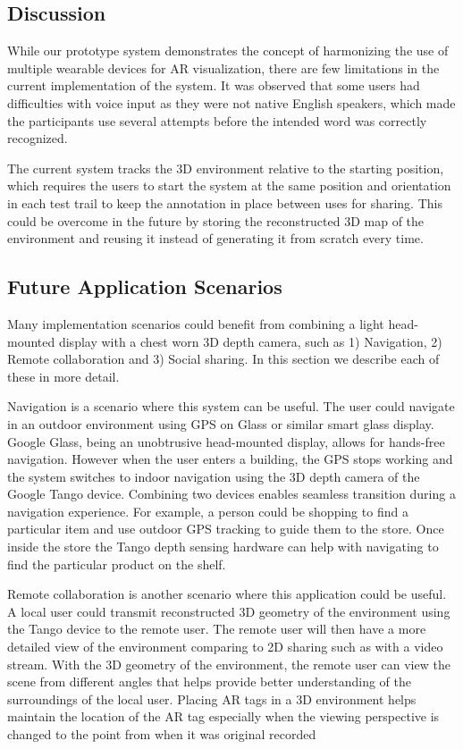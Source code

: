 \subsection{Discussion}

%
%
While our prototype  system demonstrates the concept of harmonizing the use of multiple wearable devices for AR visualization, there are few limitations in the current implementation of the system. It was observed that some users had difficulties with voice input as they were not native English speakers, which made the participants use several attempts before the intended word was correctly recognized.  

The current system tracks the 3D environment relative to the starting position, which requires the users to start the system at the same position and orientation in each test trail to keep the annotation in place between uses for sharing. This could be overcome in the future by storing the reconstructed 3D map of the environment and reusing it instead of generating it from scratch every time. 

\subsection{Future Application Scenarios}

Many implementation scenarios could benefit from combining a light head-mounted display with a chest worn 3D depth camera,  such as 1) Navigation, 2) Remote collaboration and 3) Social sharing. In this section we describe each of these in more detail.

Navigation is a scenario where this system can be useful. The user could navigate in an outdoor environment using GPS on Glass or similar smart glass display. Google Glass, being an unobtrusive head-mounted display, allows for hands-free navigation. However when the user enters a building, the GPS stops working and the system switches to indoor navigation using the 3D depth camera of the Google Tango device. Combining two devices enables seamless transition during a navigation experience. For example, a person could be shopping to find a particular item and use outdoor GPS tracking to guide them to the store. Once inside the store the Tango depth sensing hardware can help with navigating to find the particular product on the shelf.

Remote collaboration is another scenario where this application could be useful. A local user could transmit reconstructed 3D geometry of the environment using the Tango device to the remote user. The remote user will then have a more detailed view of the environment comparing to 2D sharing such as with a video stream. With the 3D geometry of the environment, the remote user can view the scene from different angles that helps provide better understanding of the surroundings of the local user. Placing AR tags in a 3D environment helps maintain the location of the AR tag especially when the viewing perspective is changed to the point from when it was original recorded

